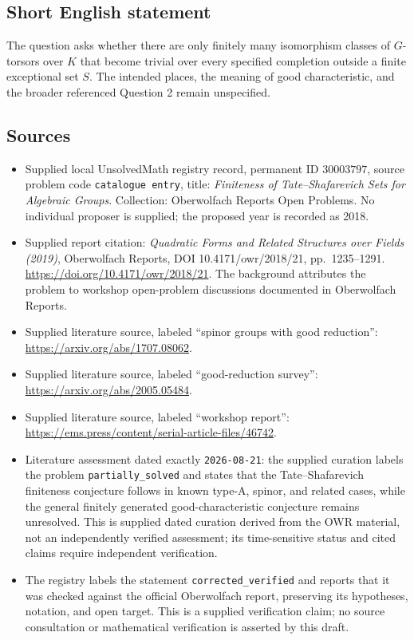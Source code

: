 \documentclass[11pt]{article}
\begin{document}
\subsection{Short English statement}
The question asks whether there are only finitely many isomorphism classes of \(G\)-torsors over \(K\) that become trivial over every specified completion outside a finite exceptional set \(S\). The intended places, the meaning of good characteristic, and the broader referenced Question 2 remain unspecified.
\subsection{Sources}
\begin{itemize}
\item Supplied local UnsolvedMath registry record, permanent ID \(30003797\), source problem code \texttt{catalogue entry}, title: \emph{Finiteness of Tate--Shafarevich Sets for Algebraic Groups}. Collection: Oberwolfach Reports Open Problems. No individual proposer is supplied; the proposed year is recorded as 2018.
\item Supplied report citation: \emph{Quadratic Forms and Related Structures over Fields (2019)}, Oberwolfach Reports, DOI 10.4171/owr/2018/21, pp.~1235--1291. \url{https://doi.org/10.4171/owr/2018/21}. The background attributes the problem to workshop open-problem discussions documented in Oberwolfach Reports.
\item Supplied literature source, labeled ``spinor groups with good reduction'': \url{https://arxiv.org/abs/1707.08062}.
\item Supplied literature source, labeled ``good-reduction survey'': \url{https://arxiv.org/abs/2005.05484}.
\item Supplied literature source, labeled ``workshop report'': \url{https://ems.press/content/serial-article-files/46742}.
\item Literature assessment dated exactly \texttt{2026-08-21}: the supplied curation labels the problem \texttt{partially\_solved} and states that the Tate--Shafarevich finiteness conjecture follows in known type-A, spinor, and related cases, while the general finitely generated good-characteristic conjecture remains unresolved. This is supplied dated curation derived from the OWR material, not an independently verified assessment; its time-sensitive status and cited claims require independent verification.
\item The registry labels the statement \texttt{corrected\_verified} and reports that it was checked against the official Oberwolfach report, preserving its hypotheses, notation, and open target. This is a supplied verification claim; no source consultation or mathematical verification is asserted by this draft.
\end{itemize}
\end{document}

